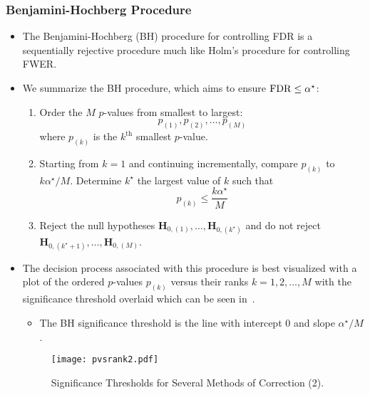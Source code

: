 \subsubsection*{Benjamini-Hochberg Procedure}
\begin{itemize}
    \item The Benjamini-Hochberg (BH) procedure for controlling FDR is a sequentially rejective procedure
          much like Holm's procedure for controlling FWER\@.
    \item We summarize the BH procedure, which aims to ensure $ \operatorname{FDR}\le \alpha^\star $:
          \begin{framed}
              \begin{enumerate}
                  \item Order the $M$ $p$-values from smallest to largest:
                        \[ p_{(1)},p_{(2)},\ldots,p_{(M)} \]
                        where $ p_{(k)} $ is the $ k^{\text{th}} $ smallest $ p $-value.
                  \item Starting from $ k=1 $ and continuing incrementally, compare
                        $ p_{(k)} $ to $ k\alpha^\star/M $. Determine $ k^\star $
                        the largest value of $ k $ such that
                        \[ p_{(k)}\le \frac{k\alpha^\star}{M}  \]
                  \item Reject the null hypotheses $ \mathbf{H}_{0,(1)},\ldots,\mathbf{H}_{0,(k^\star)} $
                        and do not reject $ \mathbf{H}_{0,(k^\star+1)},\ldots,\mathbf{H}_{0,(M)} $.
              \end{enumerate}
          \end{framed}
    \item The decision process associated with this procedure is best visualized with a plot of the ordered $p$-values
          $ p_{(k)} $ versus their ranks $ k=1,2,\ldots,M $ with the significance threshold overlaid which can
          be seen in~.
          \begin{itemize}
              \item The BH significance threshold is the line with intercept $0$ and slope $ \alpha^\star/M $.
          \end{itemize}
          \begin{figure}[!htbp]
              \centering
              \texttt{[image: pvsrank2.pdf]}
              \caption{Significance Thresholds for Several Methods of Correction (2).}\label{fig:pvsrank2}
          \end{figure}

\end{itemize}
